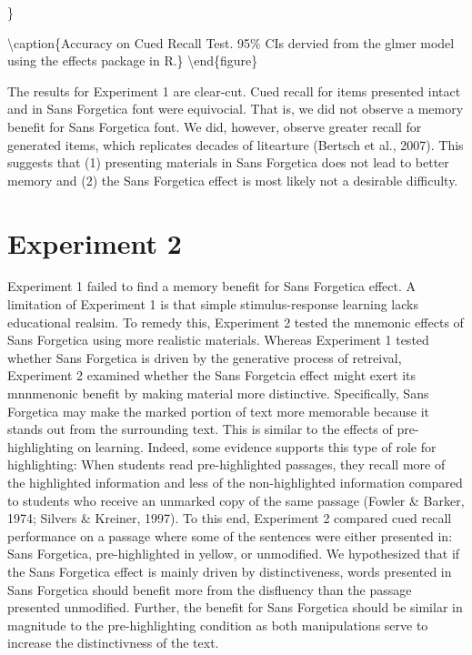 \documentclass[english,pdf]{apa6}
\begin{document}
\}

\textbackslash{}caption\{Accuracy on Cued Recall Test. 95\% CIs dervied from the glmer model using the effects package in R.\}\label{fig:unnamed-chunk-2}
\textbackslash{}end\{figure\}

The results for Experiment 1 are clear-cut. Cued recall for items presented intact and in Sans Forgetica font were equivocial. That is, we did not observe a memory benefit for Sans Forgetica font. We did, however, observe greater recall for generated items, which replicates decades of litearture (Bertsch et al., 2007). This suggests that (1) presenting materials in Sans Forgetica does not lead to better memory and (2) the Sans Forgetica effect is most likely not a desirable difficulty.

\hypertarget{experiment-2}{%
\section{Experiment 2}\label{experiment-2}}

Experiment 1 failed to find a memory benefit for Sans Forgetica effect. A limitation of Experiment 1 is that simple stimulus-response learning lacks educational realsim. To remedy this, Experiment 2 tested the mnemonic effects of Sans Forgetica using more realistic materials. Whereas Experiment 1 tested whether Sans Forgetica is driven by the generative process of retreival, Experiment 2 examined whether the Sans Forgetcia effect might exert its mnnmenonic benefit by making material more distinctive. Specifically, Sans Forgetica may make the marked portion of text more memorable because it stands out from the surrounding text. This is similar to the effects of pre-highlighting on learning. Indeed, some evidence supports this type of role for highlighting: When students read pre-highlighted passages, they recall more of the highlighted information and less of the non-highlighted information compared to students who receive an unmarked copy of the same passage (Fowler \& Barker, 1974; Silvers \& Kreiner, 1997). To this end, Experiment 2 compared cued recall performance on a passage where some of the sentences were either presented in: Sans Forgetica, pre-highlighted in yellow, or unmodified. We hypothesized that if the Sans Forgetica effect is mainly driven by distinctiveness, words presented in Sans Forgetica should benefit more from the disfluency than the passage presented unmodified. Further, the benefit for Sans Forgetica should be similar in magnitude to the pre-highlighting condition as both manipulations serve to increase the distinctivness of the text.
\end{document}
